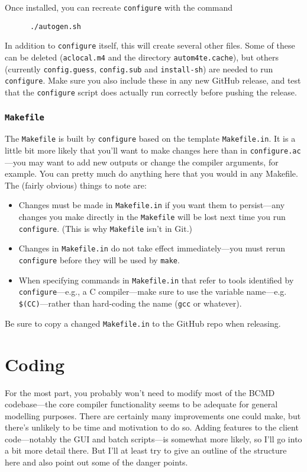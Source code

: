 \documentclass[a4paper,11pt]{article}
\begin{document}
Once installed, you can recreate \texttt{configure} with the command
\begin{verbatim}
      ./autogen.sh
\end{verbatim}
In addition to \texttt{configure} itself, this will create several other files. Some of these can be deleted (\texttt{aclocal.m4} and the directory \texttt{autom4te.cache}), but others (currently \texttt{config.guess}, \texttt{config.sub} and \texttt{install-sh}) are needed to run \texttt{configure}. Make sure you also include these in any new GitHub release, and test that the \texttt{configure} script does actually run correctly before pushing the release.

\subsubsection{\texttt{Makefile}}\label{make}

The \texttt{Makefile} is built by \texttt{configure} based on the template \texttt{Makefile.in}. It is a little bit more likely that you'll want to make changes here than in \texttt{configure.ac}---you may want to add new outputs or change the compiler arguments, for example. You can pretty much do anything here that you would in any Makefile. The (fairly obvious) things to note are:
\begin{itemize}
\item Changes must be made in \texttt{Makefile.in} if you want them to persist---any changes you make directly in the \texttt{Makefile} will be lost next time you run \texttt{configure}. (This is why \texttt{Makefile} isn't in Git.)
\item Changes in \texttt{Makefile.in} do not take effect immediately---you must rerun \texttt{configure} before they will be used by \texttt{make}.
\item When specifying commands in \texttt{Makefile.in} that refer to tools identified by \texttt{configure}---e.g., a C compiler---make sure to use the variable name---e.g. \texttt{\$(CC)}---rather than hard-coding the name (\texttt{gcc} or whatever).
\end{itemize}
Be sure to copy a changed \texttt{Makefile.in} to the GitHub repo when releasing.

\section{Coding}\label{code}

For the most part, you probably won't need to modify most of the BCMD codebase---the core compiler functionality seems to be adequate for general modelling purposes. There are certainly many improvements one could make, but there's unlikely to be time and motivation to do so. Adding features to the client code---notably the GUI and batch scripts---is somewhat more likely, so I'll go into a bit more detail there. But I'll at least try to give an outline of the structure here and also point out some of the danger points.
\end{document}
